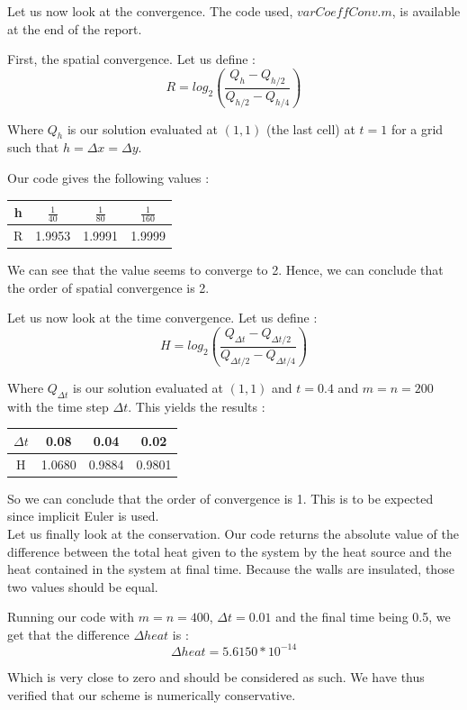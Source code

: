 Let us now look at the convergence. The code used, $varCoeffConv.m$, is available at the end of the report.

First, the spatial convergence. Let us define :
$$R = log_2(\frac{Q_h-Q_{h/2}}{Q_{h/2}-Q_{h/4}})$$

Where $Q_h$ is our solution evaluated at $(1,1)$ (the last cell) at $t=1$ for a grid such that $h=\Delta x= \Delta y$.

Our code gives the following values : 
\begin{center}
\begin{tabular}{|c|c|c|c|}
\hline 
h & $\frac{1}{40}$ & $\frac{1}{80}$ & $\frac{1}{160}$ \\ 
\hline 
R & 1.9953 & 1.9991 & 1.9999 \\ 
\hline 
\end{tabular} 
\end{center}

We can see that the value seems to converge to 2. Hence, we can conclude that the order of spatial convergence is 2.

Let us now look at the time convergence. Let us define :
$$H = log_2(\frac{Q_{\Delta t}-Q_{\Delta t/2}}{Q_{\Delta t/2}-Q_{\Delta t/4}})$$

Where $Q_{\Delta t}$ is our solution evaluated at $(1,1)$ and $t=0.4$ and $m=n=200$ with the time step $\Delta t$. This yields the results : 
\begin{center}
\begin{tabular}{|c|c|c|c|}
\hline 
$\Delta t$ & 0.08 & 0.04 & 0.02 \\ 
\hline 
H & 1.0680 & 0.9884 & 0.9801 \\ 
\hline 
\end{tabular} 
\end{center}

So we can conclude that the order of convergence is 1. This is to be expected since implicit Euler is used.\\

Let us finally look at the conservation. Our code returns the absolute value of the difference between the total heat given to the system by the heat source and the heat contained in the system at final time. Because the walls are insulated, those two values should be equal.

Running our code with $m=n=400$, $\Delta t = 0.01$ and the final time being 0.5, we get that the difference $\Delta heat$ is :
$$\Delta heat = 5.6150 * 10^{-14}$$

Which is very close to zero and should be considered as such. We have thus verified that our scheme is numerically conservative.

